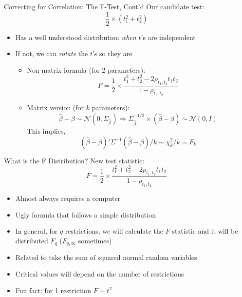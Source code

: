 \documentclass[aspectratio=169,11pt]{beamer}
\begin{document}
\begin{frame}{Correcting for Correlation: The F-Test, Cont'd}
Our candidate test:
	\[
		\frac{1}{2}\times (t_1^2 + t_2^2)
	\]

\begin{itemize}
	\item Has a well understood distribution \emph{when} $t$'s are independent
	\item If not, we can \emph{rotate} the $t$'s so they are
	\begin{itemize}
		\item Non-matrix formula (for 2 parameters):
		\[
			F = \frac{1}{2}\times\frac{t_1^2 + t_2^2 - 2\rho_{t_1,t_2}t_1t_2}{1-\rho_{t_1,t_2}}
		\]
		\item Matrix version (for $k$ parameters):
		\[
			\hat\beta-\beta\sim\mathcal{N}\left(0,\Sigma_{\hat\beta}\right)\Rightarrow \Sigma_{\hat\beta}^{-1/2}\times\left(\hat\beta-\beta\right)\sim\mathcal{N}(0,I)
		\]
		This implies,
		\[
		(\hat\beta-\beta)'\Sigma^{-1}(\hat\beta-\beta)/k\sim\chi^2_k/k = F_k
		\]
		
		
	\end{itemize}	
\end{itemize}	
\end{frame}

\begin{frame}{What is the F Distribution?}
New test statistic:
		\[
			F = \frac{1}{2}\times\frac{t_1^2 + t_2^2 - 2\rho_{t_1,t_2}t_1t_2}{1-\rho_{t_1,t_2}}
		\]

\begin{itemize}
	\item Almost always requires a computer
	\item Ugly formula that follows a simple distribution
	\item In general, for $q$ restrictions, we will calculate the $F$ statistic and it will be distributed $F_q$ ($F_{q,\infty}$ sometimes)
	\item Related to take the sum of squared normal random variables
	\item Critical values will depend on the number of restrictions
	\item Fun fact: for 1 restriction $F = t^2$
\end{itemize}

	
\end{frame}
\end{document}
